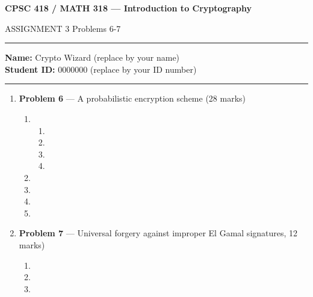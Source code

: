\documentclass[11pt]{article}
\theoremstyle{definition}
\begin{document}
\begin{center}
{\bf \Large CPSC 418 / MATH 318 --- Introduction to Cryptography

ASSIGNMENT 3 \qquad Problems 6-7}
\end{center}

\hrule 	

\textbf{Name:} Crypto Wizard (replace by your name) \\
\textbf{Student ID:} 0000000 (replace by your ID number)

\medskip \hrule

\begin{enumerate} \itemsep 20pt

\item[] \textbf{Problem 6} --- A probabilistic encryption scheme (28 marks)


\begin{enumerate}

\item \begin{enumerate}

\item %

\item %

\item %

\item %

\end{enumerate}

\item %

\item %

\item %

\item %
\end{enumerate}

\newpage

\item[] \textbf{Problem 7} --- Universal forgery against improper El Gamal signatures, 12 marks)

\begin{enumerate}

\item %

\item %

\item %

\end{enumerate}

\end{enumerate}
\end{document}
